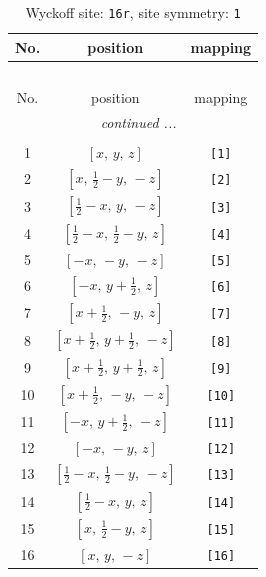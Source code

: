 \documentclass[fleqn,8pt]{jsarticle}
\begin{document}
\begin{longtable}{ccc}
\caption{Wyckoff site: {\tt 16r}, site symmetry: {\tt 1}}
 \\
 \hline \hline
No. & position & mapping \\ \hline \endfirsthead

\multicolumn{2}{l}{\tablename\ \thetable{}} \\
 \hline \hline
No. & position & mapping \\ \hline \endhead

 \hline \hline
\multicolumn{2}{r}{\footnotesize\it continued ...} \\ \endfoot

 \hline \hline
\multicolumn{2}{r}{} \\ \endlastfoot

1 & $\left[ x,\, y,\, z \right]$ & {\tt [1]} \\ \hline
2 & $\left[ x,\, \frac{1}{2} - y,\, - z \right]$ & {\tt [2]} \\ \hline
3 & $\left[ \frac{1}{2} - x,\, y,\, - z \right]$ & {\tt [3]} \\ \hline
4 & $\left[ \frac{1}{2} - x,\, \frac{1}{2} - y,\, z \right]$ & {\tt [4]} \\ \hline
5 & $\left[ - x,\, - y,\, - z \right]$ & {\tt [5]} \\ \hline
6 & $\left[ - x,\, y + \frac{1}{2},\, z \right]$ & {\tt [6]} \\ \hline
7 & $\left[ x + \frac{1}{2},\, - y,\, z \right]$ & {\tt [7]} \\ \hline
8 & $\left[ x + \frac{1}{2},\, y + \frac{1}{2},\, - z \right]$ & {\tt [8]} \\ \hline
9 & $\left[ x + \frac{1}{2},\, y + \frac{1}{2},\, z \right]$ & {\tt [9]} \\ \hline
10 & $\left[ x + \frac{1}{2},\, - y,\, - z \right]$ & {\tt [10]} \\ \hline
11 & $\left[ - x,\, y + \frac{1}{2},\, - z \right]$ & {\tt [11]} \\ \hline
12 & $\left[ - x,\, - y,\, z \right]$ & {\tt [12]} \\ \hline
13 & $\left[ \frac{1}{2} - x,\, \frac{1}{2} - y,\, - z \right]$ & {\tt [13]} \\ \hline
14 & $\left[ \frac{1}{2} - x,\, y,\, z \right]$ & {\tt [14]} \\ \hline
15 & $\left[ x,\, \frac{1}{2} - y,\, z \right]$ & {\tt [15]} \\ \hline
16 & $\left[ x,\, y,\, - z \right]$ & {\tt [16]} \\
\end{longtable}
\end{document}
